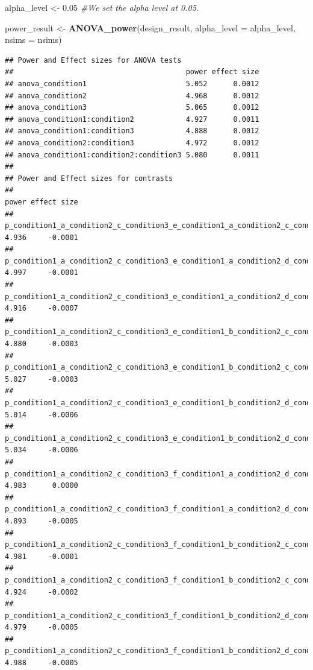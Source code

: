 \documentclass[]{article}
\newenvironment{Shaded}{\begin{snugshade}}{\end{snugshade}}
\newcommand{\KeywordTok}[1]{\textcolor[rgb]{0.13,0.29,0.53}{\textbf{#1}}}
\newcommand{\DataTypeTok}[1]{\textcolor[rgb]{0.13,0.29,0.53}{#1}}
\newcommand{\FloatTok}[1]{\textcolor[rgb]{0.00,0.00,0.81}{#1}}
\newcommand{\StringTok}[1]{\textcolor[rgb]{0.31,0.60,0.02}{#1}}
\newcommand{\CommentTok}[1]{\textcolor[rgb]{0.56,0.35,0.01}{\textit{#1}}}
\newcommand{\NormalTok}[1]{#1}
\begin{document}
\begin{Shaded}
\begin{Highlighting}[]
\NormalTok{alpha_level <-}\StringTok{ }\FloatTok{0.05}
\CommentTok{#We set the alpha level at 0.05. }

\NormalTok{power_result <-}\StringTok{ }\KeywordTok{ANOVA_power}\NormalTok{(design_result, }\DataTypeTok{alpha_level =}\NormalTok{ alpha_level, }\DataTypeTok{nsims =}\NormalTok{ nsims)}
\end{Highlighting}
\end{Shaded}

\begin{verbatim}
## Power and Effect sizes for ANOVA tests
##                                        power effect size
## anova_condition1                       5.052      0.0012
## anova_condition2                       4.968      0.0012
## anova_condition3                       5.065      0.0012
## anova_condition1:condition2            4.927      0.0011
## anova_condition1:condition3            4.888      0.0012
## anova_condition2:condition3            4.972      0.0012
## anova_condition1:condition2:condition3 5.080      0.0011
## 
## Power and Effect sizes for contrasts
##                                                                                 power effect size
## p_condition1_a_condition2_c_condition3_e_condition1_a_condition2_c_condition3_f 4.936     -0.0001
## p_condition1_a_condition2_c_condition3_e_condition1_a_condition2_d_condition3_e 4.997     -0.0001
## p_condition1_a_condition2_c_condition3_e_condition1_a_condition2_d_condition3_f 4.916     -0.0007
## p_condition1_a_condition2_c_condition3_e_condition1_b_condition2_c_condition3_e 4.880     -0.0003
## p_condition1_a_condition2_c_condition3_e_condition1_b_condition2_c_condition3_f 5.027     -0.0003
## p_condition1_a_condition2_c_condition3_e_condition1_b_condition2_d_condition3_e 5.014     -0.0006
## p_condition1_a_condition2_c_condition3_e_condition1_b_condition2_d_condition3_f 5.034     -0.0006
## p_condition1_a_condition2_c_condition3_f_condition1_a_condition2_d_condition3_e 4.983      0.0000
## p_condition1_a_condition2_c_condition3_f_condition1_a_condition2_d_condition3_f 4.893     -0.0005
## p_condition1_a_condition2_c_condition3_f_condition1_b_condition2_c_condition3_e 4.981     -0.0001
## p_condition1_a_condition2_c_condition3_f_condition1_b_condition2_c_condition3_f 4.924     -0.0002
## p_condition1_a_condition2_c_condition3_f_condition1_b_condition2_d_condition3_e 4.979     -0.0005
## p_condition1_a_condition2_c_condition3_f_condition1_b_condition2_d_condition3_f 4.988     -0.0005

\end{verbatim}
\end{document}
